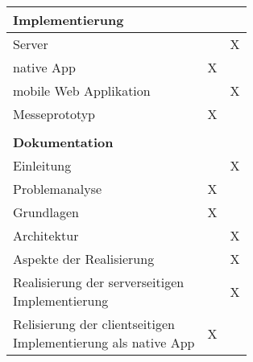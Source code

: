 \begin{table}[]
\begin{tabular}{|l|c|c|}
{\bf Implementierung}                                             &                                &                                     \\
\hline
Server                                                            &                                 & X                                   \\
\hline
native \gls{App}                                                        & X                               &                                     \\
\hline
mobile Web Applikation                                                            &                                 & X                                   \\
\hline
Messeprototyp                                                     & X                               &                                     \\
\hline
                                                                  &                                 &                                     \\
{\bf Dokumentation}                                               &                                 &                                     \\
\hline
Einleitung                                                        &                                 & X                                    \\
\hline
Problemanalyse                                                    & X                               &                                     \\
\hline
Grundlagen                                                        & X                               &                                     \\
\hline
Architektur                                                       &                                 & X                                   \\
\hline
Aspekte der Realisierung                                          &                                 & X                                   \\
\hline
\makecell[l]{Realisierung der serverseitigen\\Implementierung}    &                                 & X                                   \\
\hline
\makecell[l]{Relisierung der clientseitigen\\Implementierung als native \gls{App}}     & X                               &                                     \\

\end{tabular}
\end{table}
